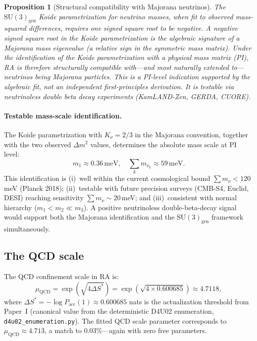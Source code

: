 \documentclass[11pt]{article}
\newtheorem{proposition}{Proposition}
\begin{document}
\begin{proposition}[Structural compatibility with Majorana neutrinos]
\label{prop:majorana}
The $\mathrm{SU}(3)_{\mathrm{gen}}$ Koide parametrization for neutrino masses, when fit to observed mass-squared differences, requires one signed square root to be negative. A negative signed square root in the Koide parametrization is the algebraic signature of a Majorana mass eigenvalue (a relative sign in the symmetric mass matrix). Under the identification of the Koide parametrization with a physical mass matrix (PI), RA is therefore structurally compatible with---and most naturally extended to---neutrinos being Majorana particles. This is a PI-level indication supported by the algebraic fit, not an independent first-principles derivation. It is testable via neutrinoless double beta decay experiments (KamLAND-Zen, GERDA, CUORE).
\end{proposition}

\paragraph{Testable mass-scale identification.} The Koide parametrization with $K_\nu=2/3$ in the Majorana convention, together with the two observed $\Delta m^2$ values, determines the absolute mass scale at PI level:
\begin{equation}
m_1 \approx 0.36\,\mathrm{meV},\quad \sum_k m_{\nu_k} \approx 59\,\mathrm{meV}.
\end{equation}
This identification is (i)~well within the current cosmological bound $\sum m_\nu<120$\,meV (Planck 2018); (ii)~testable with future precision surveys (CMB-S4, Euclid, DESI) reaching sensitivity $\sum m_\nu\sim 20$\,meV; and (iii)~consistent with normal hierarchy ($m_1<m_2\ll m_3$). A positive neutrinoless double-beta-decay signal would support both the Majorana identification and the $\mathrm{SU}(3)_{\mathrm{gen}}$ framework simultaneously.

\subsection{The QCD scale}
\label{sec:qcd_scale}

The QCD confinement scale in RA is:
\begin{equation}
\mu_{\mathrm{QCD}} = \exp\!\left(\sqrt{4\Delta S^*}\right) = \exp\!\left(\sqrt{4\times 0.600685}\right) \approx 4.7118,
\end{equation}
where $\Delta S^*=-\log P_{\mathrm{acc}}(1)\approx 0.600685$ nats is the actualization threshold from Paper~I (canonical value from the deterministic D4U02 enumeration, \texttt{d4u02\_enumeration.py}). The fitted QCD scale parameter corresponds to $\mu_{\mathrm{QCD}}\approx 4.713$, a match to $0.03\%$---again with zero free parameters.
\end{document}
